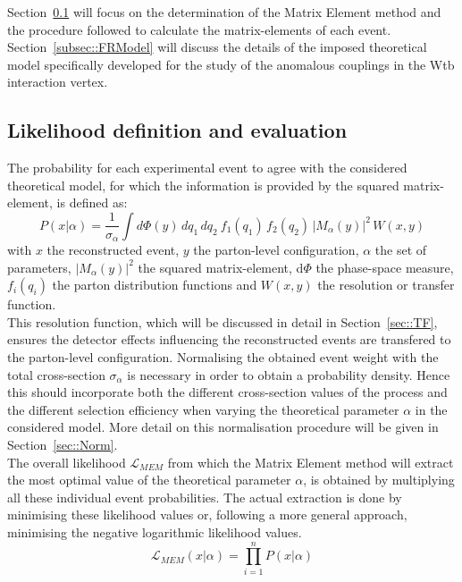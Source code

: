 Section~\ref{subsec::MWLik} will focus on the determination of the Matrix Element method and the procedure followed to calculate the matrix-elements of each event. Section~\ref{subsec::FRModel} will discuss the details of the imposed theoretical model specifically developed for the study of the anomalous couplings in the Wtb interaction vertex.

\subsection{Likelihood definition and evaluation} \label{subsec::MWLik}

The probability for each experimental event to agree with the considered theoretical model, for which the information is provided by the squared matrix-element, 
is defined as:
\begin{equation} \label{eq::MWEvtProb}
 P(x \vert \alpha) = \frac{1}{\sigma_{\alpha}} \int d\Phi(y) \, dq_{1} \, dq_{2} ~ f_{1}(q_{1}) \, f_{2}(q_{2}) \, \vert M_{\alpha}(y) \vert^{2} \, W(x,y)
\end{equation}
with $x$ the reconstructed event, $y$ the parton-level configuration, $\alpha$ the set of parameters, $\vert M_{\alpha}(y) \vert^{2}$ the squared matrix-element, d$\Phi$ the phase-space measure, $f_{i}(q_{i})$ the parton distribution functions and $W(x,y)$ the resolution or transfer function.
\\
This resolution function, which will be discussed in detail in Section~\ref{sec::TF}, ensures the detector effects influencing the reconstructed events are transfered to the parton-level configuration.
Normalising the obtained event weight with the total cross-section $\sigma_{\alpha}$ is necessary in order to obtain a probability density. Hence this should incorporate both the different cross-section values of the process and the different selection efficiency when varying the theoretical parameter $\alpha$ in the considered model. 
More detail on this normalisation procedure will be given in Section~\ref{sec::Norm}.
\\

The overall likelihood $\mathcal{L}_{MEM}$ from which the Matrix Element method will extract the most optimal value of the theoretical parameter $\alpha$, is obtained by multiplying all these individual event probabilities.
The actual extraction is done by minimising these likelihood values or, following a more general approach, minimising the negative logarithmic likelihood values.
\begin{equation}
 \mathcal{L}_{MEM}(x \vert \alpha) = \prod_{i=1}^{n} P(x \vert \alpha)
\end{equation}

